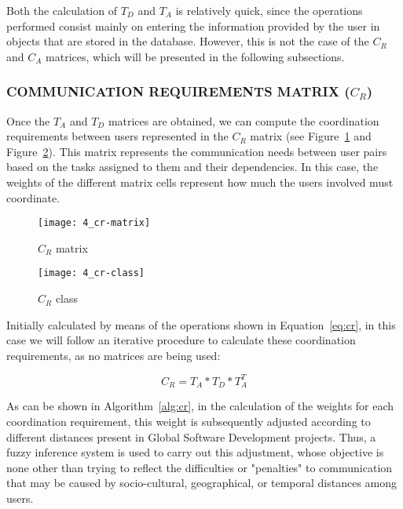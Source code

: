 Both the calculation of $T_D$ and $T_A$ is relatively quick, since the operations performed consist mainly on entering the information provided by the user in objects that are stored in the database. However, this is not the case of the $C_R$ and $C_A$ matrices, which will be presented in the following subsections.

\subsubsection{COMMUNICATION REQUIREMENTS MATRIX ($C_R$)}

Once the $T_A$ and $T_D$ matrices are obtained, we can compute the coordination requirements between users represented in the $C_R$ matrix (see Figure~\ref{fig:cr-matrix} and Figure~\ref{fig:cr-class}). This matrix represents the communication needs between user pairs based on the tasks assigned to them and their dependencies. In this case, the weights of the different matrix cells represent how much the users involved must coordinate.

\begin{figure}
	\centering
	\texttt{[image: 4\_cr-matrix]}
	\caption[$C_R$ matrix]{$C_R$ matrix}
	\label{fig:cr-matrix}
\end{figure}

\begin{figure}
	\centering
	\texttt{[image: 4\_cr-class]}
	\caption[$C_R$ class]{$C_R$ class}
	\label{fig:cr-class}
\end{figure}

Initially calculated by means of the operations shown in Equation~\ref{eq:cr}, in this case we will follow an iterative procedure to calculate these coordination requirements, as no matrices are being used:

\begin{equation}
	\label{eq:cr}
	C_R = T_A * T_D * T_A^T
\end{equation}

As can be shown in Algorithm~\ref{alg:cr}, in the calculation of the weights for each coordination requirement, this weight is subsequently adjusted according to different distances present in Global Software Development projects. Thus, a fuzzy inference system is used to carry out this adjustment, whose objective is none other than trying to reflect the difficulties or "penalties" to communication that may be caused by socio-cultural, geographical, or temporal distances among users.


